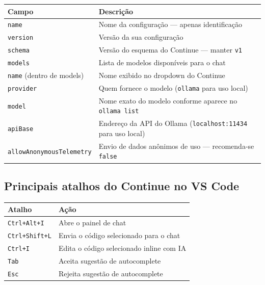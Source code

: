 \documentclass[
]{article}
\begin{document}
\begin{longtable}[]{@{}
  >{\raggedright\arraybackslash}p{}
  >{\raggedright\arraybackslash}p{}@{}}
\toprule\noalign{}
\begin{minipage}[b]{\linewidth}\raggedright
Campo
\end{minipage} & \begin{minipage}[b]{\linewidth}\raggedright
Descrição
\end{minipage} \\
\midrule\noalign{}
\endhead
\bottomrule\noalign{}
\endlastfoot
\texttt{name} & Nome da configuração --- apenas identificação \\
\texttt{version} & Versão da sua configuração \\
\texttt{schema} & Versão do esquema do Continue --- manter
\texttt{v1} \\
\texttt{models} & Lista de modelos disponíveis para o chat \\
\texttt{name} (dentro de models) & Nome exibido no dropdown do
Continue \\
\texttt{provider} & Quem fornece o modelo (\texttt{ollama} para uso
local) \\
\texttt{model} & Nome exato do modelo conforme aparece no
\texttt{ollama\ list} \\
\texttt{apiBase} & Endereço da API do Ollama (\texttt{localhost:11434}
para uso local) \\
\texttt{allowAnonymousTelemetry} & Envio de dados anônimos de uso ---
recomenda-se \texttt{false} \\
\end{longtable}

\subsection{Principais atalhos do Continue no VS
Code}\label{principais-atalhos-do-continue-no-vs-code}

\begin{longtable}[]{@{}ll@{}}
\toprule\noalign{}
Atalho & Ação \\
\midrule\noalign{}
\endhead
\bottomrule\noalign{}
\endlastfoot
\texttt{Ctrl+Alt+I} & Abre o painel de chat \\
\texttt{Ctrl+Shift+L} & Envia o código selecionado para o chat \\
\texttt{Ctrl+I} & Edita o código selecionado inline com IA \\
\texttt{Tab} & Aceita sugestão de autocomplete \\
\texttt{Esc} & Rejeita sugestão de autocomplete \\
\end{longtable}
\end{document}
